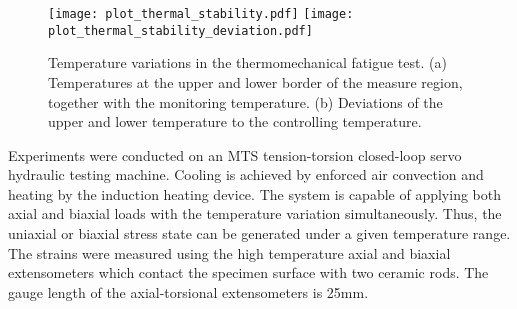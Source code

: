 \documentclass[preprint,5p,twocolumn,11pt,sort&compress]{elsarticle}
\begin{document}
\begin{figure}[!ht]
\texttt{[image: plot\_thermal\_stability.pdf]}
\texttt{[image: plot\_thermal\_stability\_deviation.pdf]}
\caption{Temperature variations in the thermomechanical fatigue test. (a) Temperatures at the upper and lower border of the measure region, together with the monitoring temperature. (b) Deviations of the upper and lower temperature to the controlling temperature.}
\label{Fig:Temp-Distr}
\end{figure}


Experiments were conducted on an MTS tension-torsion closed-loop servo hydraulic testing machine. Cooling is achieved by enforced air convection and heating by the induction heating device. The system is capable of applying both axial and biaxial loads with the temperature variation simultaneously. Thus, the uniaxial or biaxial stress state can be generated under a given temperature range. The strains were measured using the high temperature axial and biaxial extensometers which contact the specimen surface with two ceramic rods. The gauge length of the axial-torsional extensometers is 25mm.

\end{document}
